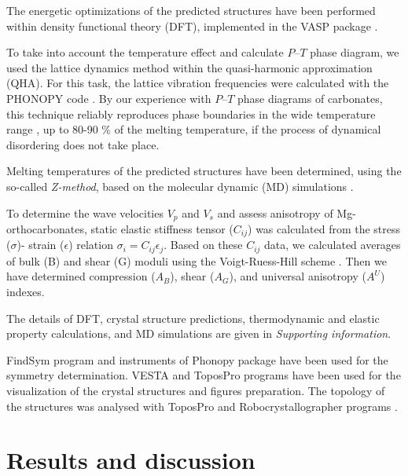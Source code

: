 \documentclass[a4paperm]{article}
\begin{document}
The energetic optimizations of the predicted structures have been performed within density functional theory (DFT), implemented in the VASP package \cite{vasp1,vasp2}.

To take into account the temperature effect and calculate $P$--$T$ phase diagram, we used the lattice dynamics method within the quasi-harmonic approximation (QHA).
For this task, the lattice vibration frequencies were calculated with the PHONOPY code \cite{phonopy}.
By our experience with $P$--$T$ phase diagrams of carbonates, this technique reliably reproduces phase boundaries in the wide temperature range \cite{gavr2019_alk, gavr2020_disarag, sagatova2020_ortho}, up to 80-90 \% of the melting temperature, if the process of dynamical disordering does not take place.

Melting temperatures of the predicted structures have been determined, using the so-called {\it Z-method}, based on the molecular dynamic (MD) simulations \cite{z-method}.

To determine the wave velocities $V_p$ and $V_s$ and assess anisotropy of Mg-orthocarbonates, static elastic stiffness tensor ($C_{ij}$) was calculated from the stress ($\sigma$)- strain ($\epsilon$) relation $\sigma_i=C_{ij}\epsilon_j$.
Based on these $C_{ij}$ data, we calculated averages of bulk (B) and shear (G) moduli using the Voigt-Ruess-Hill scheme \cite{hill1952,hill1963}.
 Then we have determined compression ($A_B$), shear ($A_G$), and universal anisotropy ($A^U$) indexes.

The details of DFT, crystal structure predictions, thermodynamic and elastic property calculations, and MD simulations are given in {\it Supporting information}.

FindSym program \cite{stokes2005} and instruments of Phonopy package have been used for the symmetry determination.
VESTA and ToposPro \cite{vesta,topos} programs have been used for the visualization of the crystal structures and figures preparation.
The topology of the structures was analysed with ToposPro and Robocrystallographer programs \cite{topos,robocrys}.


			\section{Results and discussion}
 
\end{document}
